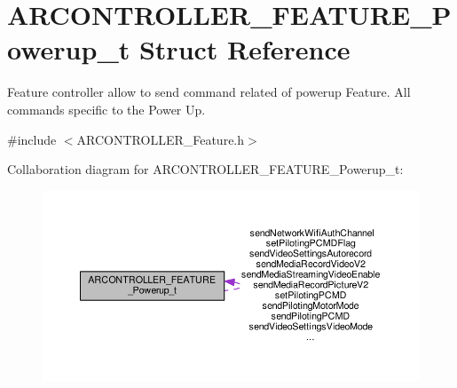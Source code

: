 \hypertarget{struct_a_r_c_o_n_t_r_o_l_l_e_r___f_e_a_t_u_r_e___powerup__t}{}\section{A\+R\+C\+O\+N\+T\+R\+O\+L\+L\+E\+R\+\_\+\+F\+E\+A\+T\+U\+R\+E\+\_\+\+Powerup\+\_\+t Struct Reference}
\label{struct_a_r_c_o_n_t_r_o_l_l_e_r___f_e_a_t_u_r_e___powerup__t}


Feature controller allow to send command related of powerup Feature. All commands specific to the Power Up.  




{\ttfamily \#include $<$A\+R\+C\+O\+N\+T\+R\+O\+L\+L\+E\+R\+\_\+\+Feature.\+h$>$}



Collaboration diagram for A\+R\+C\+O\+N\+T\+R\+O\+L\+L\+E\+R\+\_\+\+F\+E\+A\+T\+U\+R\+E\+\_\+\+Powerup\+\_\+t\+:
\nopagebreak
\begin{figure}[H]
\begin{center}
\leavevmode
\includegraphics[width=350pt]{struct_a_r_c_o_n_t_r_o_l_l_e_r___f_e_a_t_u_r_e___powerup__t__coll__graph}
\end{center}
\end{figure}
